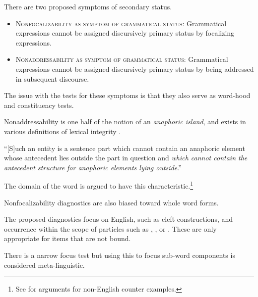 \documentclass{beamer}
\begin{document}
\begin{frame}{There are two proposed symptoms of secondary status.}

  \begin{itemize}
  \item {\scshape Nonfocalizability as symptom of grammatical status}: Grammatical expressions cannot be assigned discursively primary status by focalizing expressions. \citep[p.~14]{Boye2012}
  \item {\scshape Nonaddressability as symptom of grammatical status}: Grammatical expressions cannot be assigned discursively primary status by being addressed in subsequent discourse. \citep[p.~15]{Boye2012}
  \end{itemize}
\end{frame}

\begin{frame}{The issue with the tests for these symptoms is that they also serve as word-hood and constituency tests.}

  Nonaddressability is one half of the notion of an \emph{anaphoric island}, and exists in various definitions of lexical integrity \citep{Simpson1991}.

  \vfill
  
  ``[S]uch an entity is a sentence part which cannot contain an anaphoric element whose antecedent lies outside the part in question and \emph{which cannot contain the antecedent structure for anaphoric elements lying outside}.'' \citep[p.~205]{Postal1969}

  \vfill
  
  The domain of the word is argued to have this characteristic.\footnote{
  See \citet{Harris2006} for arguments for non-English counter examples.}
  
\end{frame}

\begin{frame}{Nonfocalizability diagnostics are also biased toward whole word forms.}

  The proposed diagnostics focus on English, such as cleft constructions, and occurrence within the scope of particles such as , , or .
  These are only appropriate for items that are not bound.

  \vfill

  There is a narrow focus test but using this to focus sub-word components is considered meta-linguistic.
\end{frame}
\end{document}
